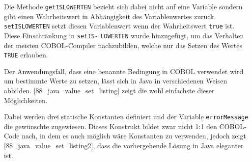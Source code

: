 
Die Methode \texttt{getISLOWERTEN} bezieht sich dabei nicht auf eine Variable sondern gibt einen Wahrheitswert in Abhängigkeit des Variablenwertes zurück. \texttt{setISLOWERTEN} setzt diesen Variablenwert wenn der Wahrheitswert \texttt{true} ist. Diese Einschränkung in \texttt{setIS-} \texttt{LOWERTEN} wurde hinzugefügt, um das Verhalten der meisten COBOL-Compiler nachzubilden, welche nur das Setzen des Wertes \texttt{TRUE} erlauben.\\


Der Anwendungsfall, dass eine benannte Bedingung in COBOL verwendet wird um bestimmte Werte zu setzen, lässt sich in Java in verschiedenen Weisen abbilden. \autoref{88_java_value_set_listing} zeigt die wohl einfachste dieser Möglichkeiten.\\


Dabei werden drei statische Konstanten definiert und der Variable \texttt{errorMessage} die gewünschte zugewiesen. Dieses Konstrukt bildet zwar nicht 1:1 den COBOL-Code nach, in dem es auch möglich wäre Konstanten zu verwenden, jedoch zeigt \autoref{88_java_value_set_listing2}, dass die vorhergehende Lösung in Java eleganter ist.